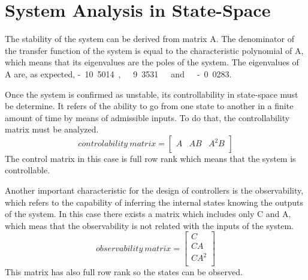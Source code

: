 \section{System Analysis in State-Space}\label{sec:SSAnalysis}
The stability of the system can be derived from matrix A. The denominator of the transfer function of the system is equal to the characteristic polynomial of A, which means that its eigenvalues are the poles of the system. The eigenvalues of A are, as expected, \si{-10.5014,\ 9.3531\ and\ -0.0283}.

Once the system is confirmed as unstable, its controllability in state-space must be determine. It refers of the ability to go from one state to another in a finite amount of time by means of admissible inputs. To do that, the controllability matrix must be analyzed.
%
\begin{equation}  \label{controlability}
	controlability\ matrix = 
	\begin{bmatrix}
		A & AB & A^2B \\
	\end{bmatrix}
\end{equation}
%
The control matrix in this case is full row rank which means that the system is controllable.

Another important characteristic for the design of controllers is the observability, which refers to the capability of inferring the internal states knowing the outputs of the system. In this case there exists a matrix which includes only C and A, which meas that the observability is not related with the inputs of the system. 
%
\begin{equation}  \label{observability}
	observability\ matrix = 
	\begin{bmatrix}
		C \\
		CA \\
		CA^2 \\
	\end{bmatrix}
\end{equation}
%
This matrix has also full row rank so the states can be observed.